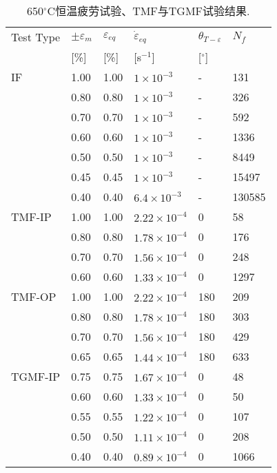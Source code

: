 \begin{table}[htbp]
  \centering
  \caption{650$^{\circ}$C恒温疲劳试验、TMF与TGMF试验结果.}
    \begin{tabular}{llllll}
    \toprule
    Test Type & $\pm \varepsilon _m$ & $\varepsilon _{eq}$ & $\dot \varepsilon _{eq}$ & $\theta_{T-\varepsilon}$ & $N_f$ \\
          & [\%]  & [\%]  & [s$^{-1}$] & [$^\circ$] &  \\
    \midrule
    IF & 1.00  & 1.00  & $1\times 10^{-3}$ & -     & 131 \\
          & 0.80  & 0.80  & $1\times 10^{-3}$ & -     & 326 \\
          & 0.70  & 0.70  & $1\times 10^{-3}$ & -     & 592 \\
          & 0.60  & 0.60  & $1\times 10^{-3}$ & -     & 1336 \\
          & 0.50  & 0.50  & $1\times 10^{-3}$ & -     & 8449 \\
          & 0.45  & 0.45  & $1\times 10^{-3}$ & -     & 15497 \\
          & 0.40  & 0.40  & $6.4\times 10^{-3}$ & -     & 130585 \\
    \midrule
    TMF-IP & 1.00  & 1.00  & $2.22\times 10^{-4}$ & 0     & 58 \\
          & 0.80  & 0.80  & $1.78\times 10^{-4}$ & 0     & 176 \\
          & 0.70  & 0.70  & $1.56\times 10^{-4}$ & 0     & 248 \\
          & 0.60  & 0.60  & $1.33\times 10^{-4}$ & 0     & 1297 \\
    \midrule
    TMF-OP & 1.00  & 1.00  & $2.22\times 10^{-4}$ & 180   & 209 \\
          & 0.80  & 0.80  & $1.78\times 10^{-4}$ & 180   & 303 \\
          & 0.70  & 0.70  & $1.56\times 10^{-4}$ & 180   & 429 \\
          & 0.65  & 0.65  & $1.44\times 10^{-4}$ & 180   & 633 \\
    \midrule
    TGMF-IP & 0.75  & 0.75  & $1.67\times 10^{-4}$ & 0     & 48 \\
          & 0.60  & 0.60  & $1.33\times 10^{-4}$ & 0     & 50 \\
          & 0.55  & 0.55  & $1.22\times 10^{-4}$ & 0     & 107 \\
          & 0.50  & 0.50  & $1.11\times 10^{-4}$ & 0     & 208 \\
          & 0.40  & 0.40  & $0.89\times 10^{-4}$ & 0     & 1066 \\

\end{tabular}
\end{table}
